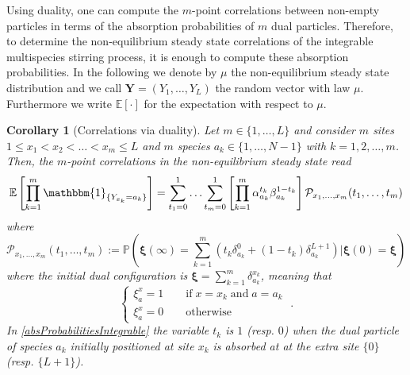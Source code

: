 \documentclass[10pt]{article}
\numberwithin{equation}{section}
\numberwithin{equation}{subsection}
\newtheorem{corollary}{Corollary}
\newcommand{\dt}{\;.}
\begin{document}
Using duality, one can compute the  $m$-point correlations between non-empty particles in terms of the absorption probabilities of $m$ dual particles. Therefore, to determine the non-equilibrium steady state correlations of the integrable multispecies stirring process, it is enough to compute these absorption probabilities. In the following we denote by $\mu$ the non-equilibrium steady state distribution and we call $\bm{Y} = (Y_1,\ldots,Y_L)$ the random vector with law $\mu$. 
Furthermore we write $\mathbb{E}[\cdot]$ for the expectation with respect to $\mu$.%
\begin{corollary}[Correlations via duality]\label{Corolollary-ABS_Corr-abstract}
Let $m\in \{1,\ldots,L\}$ and consider $m$ sites $1 \le x_{1} < x_2 < \ldots < x_m \le L $ and
$m$ species $a_{k}\in\{1,\ldots,N-1\}$  with $k=1,2,\ldots, m$. Then, the $m$-point correlations in the non-equilibrium steady state read
\begin{equation}\label{NESS-expectation-ABS}
\mathbb{E}\left[\prod_{k=1}^{m}\mathbbm{1}_{\{Y_{x_{k}}=a_{k}\}}\right]=\sum_{t_{1}=0}^{1}\ldots \sum_{t_{m}=0}^{1}\left[\prod_{k=1}^{m}\alpha_{a_{k}}^{t_{k}}\beta_{a_{k}}^{1-t_{k}}\right]\mathcal{P}_{x_1,\ldots,x_m}(t_{1},\ldots,t_{m})
\end{equation}
where
\begin{equation}\label{absProbabilitiesIntegrable}
	\mathcal{P}_{x_1,\ldots,x_m}(t_{1},\ldots,t_{m}):=\mathbb{P}\left(\bm{\xi}(\infty)=\sum_{k=1}^{m}\left(t_{k}\delta^{0}_{a_k}+(1-t_{k})\delta^{L+1}_{a_k}\right)\Big| \bm{\xi}(0)=\bm{\xi}\right)
\end{equation}
where the initial dual configuration is $\bm{\xi}=\sum_{k=1}^{m}\delta_{a_{k}}^{x_{k}}$, meaning that 
\begin{equation}
\label{xsi-init}
	\begin{cases}
		\xi_{a}^{x}=1\qquad \text{if}\;x=x_{k}\;\text{and}\; a=a_{k}\\
		\xi_{a}^{x}=0\qquad \text{otherwise}
	\end{cases}\dt
\end{equation}
In \eqref{absProbabilitiesIntegrable} the variable $t_k$ is $1$ (resp. $0$) when the dual particle of species $a_k$ initially positioned at site $x_{k}$ is absorbed at at the extra site $\{0\}$ (resp. $\{L+1\}$).
\end{corollary}
\end{document}
